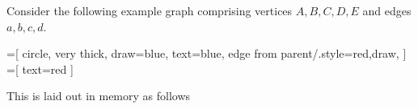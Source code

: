 \documentclass[a4paper]{article}
\begin{document}
\newcommand{\edge}[6]{
  \matrix (e) at (e.south west) [spot matrix]
  {
  	\node (e#6c1) [text=blue] {#1}; \\
    \node (e#6c2) [text=blue] {#2}; \\
    \node (e#6c3) [text=red]  {#3}; \\
    \node (e#6c4) [text=red]  {#4}; \\
    \node (e#6c5) [minimum height=9mm] {}; \\
  };
	\node at (e#6c1.west) [text width=2mm, draw=none, xshift=2mm, text=black] {$#6$};
	\node at (e#6c1.west) [text width=3mm, draw=none, xshift=-1mm, text=red, font=\scriptsize] {#5};
}

Consider the following example graph comprising vertices $A, B, C, D, E$ and edges $a, b, c, d$.
\begin{center}
	=[
			circle,
			very thick,
			draw=blue,
			text=blue,
			edge from parent/.style={red,draw},
		]
	=[
			text=red
		]
	
\end{center}
This is laid out in memory as follows
\end{document}
